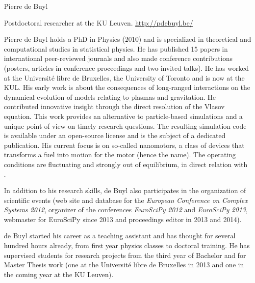 \begin{participant}[type=R,PM=12,gender=male,salary=5500]{Pierre de Buyl}

Postdoctoral researcher at the KU Leuven. \url{http://pdebuyl.be/}

Pierre de Buyl holds a PhD in Physics (2010) and is specialized in theoretical and
computational studies in statistical physics. He has published 15 papers in international
peer-reviewed journals and also made conference contributions (posters, articles in
conference proceedings and two invited talks). He has worked at the Université libre de
Bruxelles, the University of Toronto and is now at the KUL.
%
His early work is about the consequences of long-ranged interactions on the dynamical
evolution of models relating to plasmas and gravitation.
%
He contributed innovative insight through the direct resolution of the Vlasov equation.
This work provides an alternative to particle-based simulations and a unique point of view
on timely research questions. The resulting simulation code is available under an
open-source license and is the subject of a dedicated publication.
%
His current focus is on so-called nanomotors, a class of devices that transforms a fuel into
motion for the motor (hence the name). The operating conditions are fluctuating and strongly
out of equilibrium, in direct relation with \TheProject.

In addition to his research skills, de Buyl also participates in the organization of
scientific events (web site and database for the {\em European Conference on Complex Systems
  2012}, organizer of the conferences {\em EuroSciPy 2012} and {\em EuroSciPy 2013},
webmaster for EuroSciPy since 2013 and proceedings editor in 2013 and 2014).

de Buyl started his career as a teaching assistant and has thought for several hundred hours
already, from first year physics classes to doctoral training. He has supervised students
for research projects from the third year of Bachelor and for Master Thesis work (one at the
Université libre de Bruxelles in 2013 and one in the coming year at the KU Leuven).

\end{participant}
